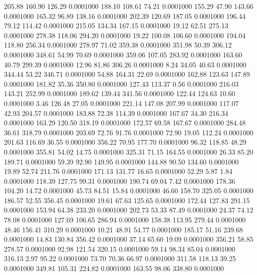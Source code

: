  205.88  160.90  126.29   0.0001000
 188.10  108.61   74.21   0.0001000
 155.29   47.90  143.66   0.0001000
 165.32   96.89  138.16   0.0001000
 202.39  120.69  187.05   0.0001000
 196.44   79.12  114.42   0.0001000
 215.05  134.34  167.15   0.0001000
  19.12   62.51  275.13   0.0001000
 278.38  118.06  294.20   0.0001000
  19.22  100.08  106.60   0.0001000
 194.04  118.80  256.34   0.0001000
 278.97   71.02  359.38   0.0001000
 351.98   50.39  306.12   0.0001000
 348.61   54.99   70.69   0.0001000
 359.06  107.05  283.92   0.0001000
 163.60   40.79  299.39   0.0001000
  12.96   81.86  306.26   0.0001000
   8.24   34.05   40.63   0.0001000
 344.44   53.22  346.71   0.0001000
  54.88  164.31   22.69   0.0001000
 162.88  123.63  147.89   0.0001000
 181.82   35.36  350.80   0.0001000
 127.43  113.37    0.56   0.0001000
 216.03  143.21  252.99   0.0001000
 189.62  139.44  341.56   0.0001000
 122.44  124.63   10.60   0.0001000
   3.46  126.48   27.05   0.0001000
 221.14  147.08  207.99   0.0001000
 117.07   42.93  204.57   0.0001000
 183.88   72.38  114.39   0.0001000
 167.67   34.30  216.34   0.0001000
 163.29  120.50  318.19   0.0001000
 172.57   69.58  167.67   0.0001000
 284.48   36.61  318.79   0.0001000
 203.69   72.76   91.76   0.0001000
  72.90   19.05  112.24   0.0001000
 201.63  116.69   36.55   0.0001000
 356.22   70.95  177.70   0.0001000
  96.32  118.85   48.29   0.0001000
 355.81   54.02   14.75   0.0001000
 325.31   71.15  164.55   0.0001000
  26.33   85.20  189.71   0.0001000
  59.39   92.90  149.95   0.0001000
 144.88   90.50  134.60   0.0001000
  19.89   52.74  211.76   0.0001000
 171.13  131.77   16.65   0.0001000
  52.29    5.87    1.84   0.0001000
 118.39  127.75   99.31   0.0001000
 190.74   69.04    7.42   0.0001000
 178.36  104.20   14.72   0.0001000
  45.73   84.51   15.84   0.0001000
  46.60  158.70  325.05   0.0001000
 186.57   52.55  356.45   0.0001000
  19.61   67.63  125.65   0.0001000
 172.44  127.83  291.15   0.0001000
 153.94   64.38  233.20   0.0001000
 202.73   53.33   87.49   0.0001000
  24.37   74.12   78.08   0.0001000
 127.69  106.65  286.94   0.0001000
 158.38  113.95  279.44   0.0001000
  48.46  156.41  310.29   0.0001000
  10.21   48.91   54.77   0.0001000
 185.17   51.16  239.68   0.0001000
  14.83  130.84  356.42   0.0001000
  37.14   65.60   19.09   0.0001000
 356.21   58.85  278.57   0.0001000
  92.98  121.54  320.15   0.0001000
  59.14   98.34   85.04   0.0001000
 316.13    2.97   95.22   0.0001000
  73.70   70.36   66.97   0.0001000
 311.58  118.13   39.25   0.0001000
 349.81  105.31  224.82   0.0001000
 163.55   98.06  338.80   0.0001000
